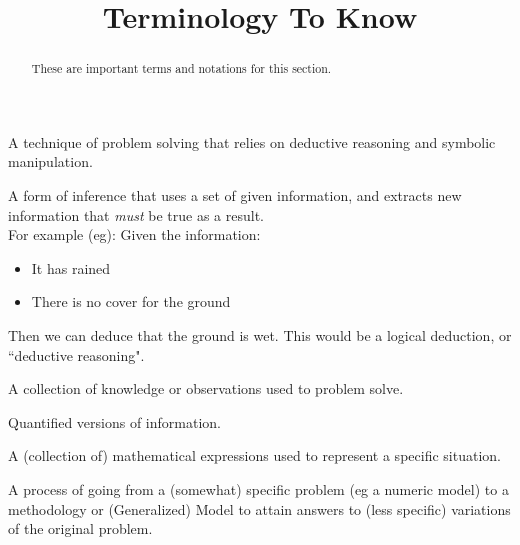 \documentclass{ximera}
\title{Terminology To Know}
\begin{document}
\begin{abstract}
    These are important terms and notations for this section.
\end{abstract}
\maketitle

\begin{definition}
    A technique of problem solving that relies on deductive reasoning and symbolic manipulation.
\end{definition}

\begin{definition}
    A form of inference that uses a set of given information, and extracts new information that \emph{must} be true as a result. \\For example (eg): Given the information:
    \begin{itemize}
        \item It has rained 
        \item There is no cover for the ground 
    \end{itemize}
    Then we can deduce that the ground is wet. This would be a logical deduction, or ``deductive reasoning".
\end{definition}

\begin{definition}[Information]
    A collection of knowledge or observations used to problem solve.
\end{definition}

\begin{definition}[Data]
    Quantified versions of information.
\end{definition}

\begin{definition}[Model]
    A (collection of) mathematical expressions used to represent a specific situation.
\end{definition}

\begin{definition}[Generalize]
    A process of going from a (somewhat) specific problem (eg a numeric model) to a methodology or (Generalized) Model to attain answers to (less specific) variations of the original problem.
\end{definition}
\end{document}
